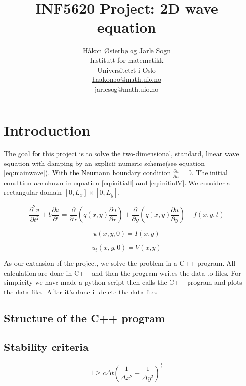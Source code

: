 \documentclass[12pt,a4paper,english]{article}
\title{INF5620 Project: 2D wave equation}
\author{Håkon Østerbø og Jarle Sogn\\ Institutt for matematikk\\
Universitetet i Oslo\\ \url{haakonoo@math.uio.no} \\ \url{jarlesog@math.uio.no}}
\begin{document}
\maketitle


\section*{Introduction}
The goal for this project is to solve the two-dimensional, standard, linear wave equation with damping by an explicit numeric scheme(see equation \ref{eq:mainwave}). With the Neumann boundary condition $\frac{\partial u}{\partial n} = 0$. The initial condition are shown in equation \ref{eq:initialI} and \ref{eq:initialV}. We consider a rectangular domain $\left[ 0,L_x\right] \times \left[0,L_y \right] $.

\begin{equation}
\frac{\partial^2 u}{\partial t^2} + b\frac{\partial u}{\partial t} = \frac{\partial}{\partial x}\left(  q\left( x,y\right) \frac{\partial u}{\partial x}\right) +\frac{\partial}{\partial y}\left(  q\left( x,y\right) \frac{\partial u}{\partial y}\right) + f\left( x,y,t\right)
\label{eq:mainwave}
\end{equation}

\begin{equation}
u\left( x,y,0\right) = I\left( x,y\right)  
\label{eq:initialI}
\end{equation}

\begin{equation}
u_t \left( x,y,0\right) = V\left( x,y\right)  
\label{eq:initialV}
\end{equation}

As our extension of the project, we solve the problem in a C++ program. All calculation are done in C++ and then the program writes the data to files. For simplicity we have made a python script then calls the C++ program and plots the data files. After it's done it delete the data files.

\subsection*{Structure of the C++ program}
\subsection*{Stability criteria}
\begin{equation}
1 \geq c\Delta t \left(\frac{1}{\Delta x^2} + \frac{1}{\Delta y^2}\right)^{\frac{1}{2}} 
\label{eq:stability_crit}
\end{equation}
\end{document}
